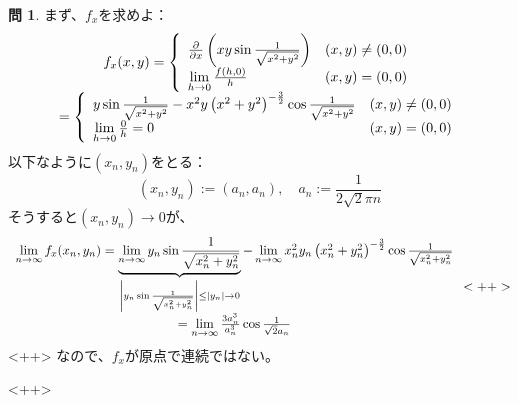 \documentclass[12pt]{article} %
\theoremstyle{definition}
\newtheorem{question}{問}
\begin{document}
\begin{question}
	まず、$f_x$を求めよ：\begin{equation*}
		\begin{array}[]{c}
			f_x(x,y)=\left\{\begin{array}[]{ll}
				\frac{\partial}{\partial x}\left( xy\sin\frac{1}{\sqrt{x^2+y^2}} \right)&(x,y)\neq(0,0)\\
				\lim_{h\to0}\frac{f(h,0)}{h}&(x,y)=(0,0)
			\end{array}\right.\\
			=\left\{\begin{array}[]{ll}
				y\sin\frac{1}{\sqrt{x^2+y^2}}-x^2y\left( x^2+y^2 \right)^{-\frac{3}{2}}\cos\frac{1}{\sqrt{x^2+y^2}}&(x,y)\neq(0,0)\\
				\lim_{h\to0}\frac{0}{h}=0&(x,y)=(0,0)
			\end{array}\right.
		\end{array}
	\end{equation*}
		以下なように$(x_n,y_n)$をとる：
		\begin{equation*}
			(x_n,y_n):=\left( a_n,a_n \right),\quad a_n:=\frac{1}{2\sqrt{2}\pi n}
		\end{equation*}
		そうすると$(x_n,y_n)\to0$が、
		\begin{equation*}
			\begin{array}[]{c}
				\lim_{n\to\infty}f_x(x_n,y_n)=
				\underbrace{\lim_{n\to\infty}y_n\sin\frac{1}{\sqrt{x_n^2+y_n^2}}}_{\myabs{y_n\sin\frac{1}{\sqrt{x_n^2+y_n^2}}}\le\myabs{y_n}\to0}
				-\lim_{n\to\infty}x_n^2y_n\left( x_n^2+y_n^2 \right)^{-\frac{3}{2}}
				\cos\frac{1}{\sqrt{x_n^2+y_n^2}}\\
				=\lim_{n\to\infty}\frac{3a_n^3}{a_n^3}\cos\frac{1}{\sqrt{2}a_n}
			\end{array}<++>
		\end{equation*}<++>
		なので、$f_x$が原点で連続ではない。
\end{question}<++>
\end{document}

